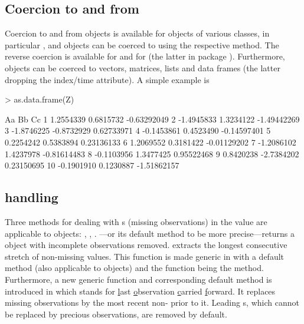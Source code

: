 \documentclass{Z}
\begin{document}
\subsection[Coercion to and from "zoo"]{Coercion to and from }
\label{sec:as.zoo}

Coercion to and from  objects is available for objects of
various classes, in particular ,  and 
objects can be coerced to  using the  respective 
method. The reverse coercion is available for  and for 
(the latter in package ).
Furthermore,  objects can be coerced to vectors, matrices, lists and
data frames (the latter dropping the index/time attribute). A simple example is
\begin{Schunk}
\begin{Sinput}
> as.data.frame(Z)
\end{Sinput}
\begin{Soutput}
           Aa         Bb          Cc
1   1.2554339  0.6815732 -0.63292049
2  -1.4945833  1.3234122 -1.49442269
3  -1.8746225 -0.8732929  0.62733971
4  -0.1453861  0.4523490 -0.14597401
5   0.2254242  0.5383894  0.23136133
6   1.2069552  0.3181422 -0.01129202
7  -1.2086102  1.4237978 -0.81614483
8  -0.1103956  1.3477425  0.95522468
9   0.8420238 -2.7384202  0.23150695
10 -0.1901910  0.1230887 -1.51862157
\end{Soutput}
\end{Schunk}


\subsection[NA handling]{ handling}

Three methods for dealing with s (missing observations) 
in the value are applicable to  objects:
, , .
---or its default method to be more precise---returns a 
object with incomplete observations removed. 
extracts the longest consecutive stretch of non-missing values.
This function is made generic in  with a default method
(also applicable to  objects) and the  function
being the  method. Furthermore, a new generic function
 and corresponding default method is introduced in 
which stands for \underline{l}ast \underline{o}bservation \underline{c}arried
\underline{f}orward. It replaces missing observations by the most recent
non- prior to it. Leading s, which cannot be replaced
by precious observations, are removed by default.
\end{document}
